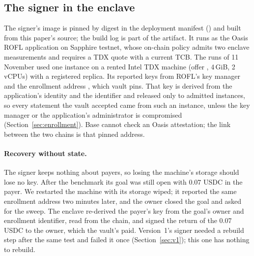 \begin{table}[t]
\centering\small

\caption{The A2 campaign on vault  with the signer in the enclave, 11 November 2026. Evidence: tx, submitted transaction; sim, refusal in gas simulation; signer, signer
response; read, contract read; code, code observation. Generated from the run log.}
\label{tab:adv}
\end{table}

\subsection{The signer in the enclave}
\label{sec:enclaveeval}

The signer's image is pinned by digest in the deployment manifest () and built from this paper's source; the build
log is part of the artifact. It runs as the Oasis ROFL application  on Sapphire testnet, whose on-chain policy admits two
enclave measurements and requires a TDX quote with a current TCB. The runs of 11 November used one instance on a rented Intel TDX machine (offer
, 4\,GiB, 2 vCPUs) with a registered replica. Its  reported keys from ROFL's key manager and the enrollment address
, which vault  pins. That key is derived from the application's identity and the identifier
 and released only to admitted instances, so every statement the vault accepted came from such an instance, unless the key manager
or the application's administrator is compromised (Section~\ref{sec:enrollment}). Base cannot check an Oasis attestation; the link between the two chains
is that pinned address.

\paragraph{Recovery without state.} The signer keeps nothing about payers, so losing the machine's storage should lose no key. After the benchmark its goal
was still open with 0.07 USDC in the payer. We restarted the machine with its storage wiped; it reported the same enrollment address two minutes later, and
the owner closed the goal and asked for the sweep. The enclave re-derived the payer's key from the goal's owner and enrollment identifier, read from the
chain, and signed the return of the 0.07 USDC to the owner, which the vault's  paid. Version~1's signer needed a rebuild step after the same test
and failed it once (Section~\ref{sec:v1}); this one has nothing to rebuild.

